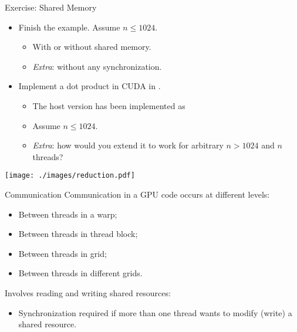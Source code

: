 \documentclass[aspectratio=43]{beamer}
\begin{document}
\begin{frame}[fragile]{Exercise: Shared Memory}
    \begin{itemize}
        \item Finish the  example. Assume $n\leq1024$.
        \begin{itemize}
            \item With or without shared memory.
            \item \emph{Extra}: without any synchronization.
        \end{itemize}
        \item Implement a dot product in CUDA in .
        \begin{itemize}
            \item The host version has been implemented as 
            \item Assume $n\leq1024$.
            \item \emph{Extra}: how would you extend it to work for arbitrary $n>1024$ and $n$ threads?
        \end{itemize}
    \end{itemize}

    \centering \texttt{[image: ./images/reduction.pdf]}

\end{frame}

\begin{frame}[fragile]{Communication}
    Communication in a GPU code occurs at different levels:
    \begin{itemize}
        \item Between threads in a warp;
        \item Between threads in thread block;
        \item Between threads in grid;
        \item Between threads in different grids.
    \end{itemize}
    Involves reading and writing shared resources:
    \begin{itemize}
        \item Synchronization required if more than one thread wants to modify (write) a shared resource.
    \end{itemize}
\end{frame}
\end{document}

